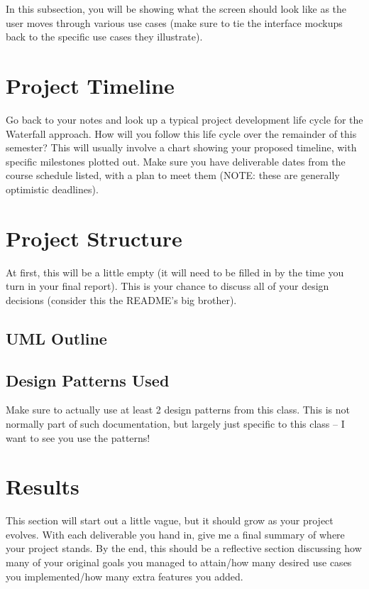 \documentclass[10pt,conference,onecolumn,compsoc]{IEEEtran}
\begin{document}
In this subsection, you will be showing what the screen should look like as the user moves through various use cases (make sure to tie the interface mockups back to the specific use cases they illustrate).



\section{Project Timeline}
Go back to your notes and look up a typical project development life cycle for the Waterfall approach.  How will you follow this life cycle over the remainder of this semester?  This will usually involve a chart showing your proposed timeline, with specific milestones plotted out.  Make sure you have deliverable dates from the course schedule listed, with a plan to meet them (NOTE: these are generally optimistic deadlines).

\section{Project Structure}
At first, this will be a little empty (it will need to be filled in by the time you turn in your final report).  This is your chance to discuss all of your design decisions (consider this the README's big brother).

\subsection{UML Outline}





\subsection{Design Patterns Used}
Make sure to actually use at least 2 design patterns from this class.  This is not normally part of such documentation, but largely just specific to this class -- I want to see you use the patterns!


\section{Results}
This section will start out a little vague, but it should grow as your project evolves.  With each deliverable you hand in, give me a final summary of where your project stands.  By the end, this should be a reflective section discussing how many of your original goals you managed to attain/how many desired use cases you implemented/how many extra features you added.
\end{document}
